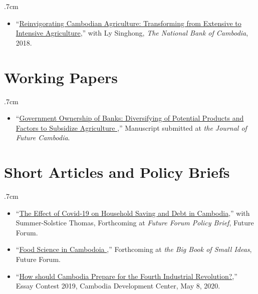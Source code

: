 \documentclass[10pt,a4paper]{article}
\begin{document}
		\begin{adjustwidth}{.7cm}{}
			\begin{itemize}[label={},itemindent=-2em,leftmargin=2em]
					
				\item “\href{https://ideas.repec.org/p/pra/mprapa/93086.html}{Reinvigorating Cambodian Agriculture: Transforming from Extensive to Intensive Agriculture},” with Ly Singhong, \textit{The National Bank of Cambodia}, 2018.	
			\end{itemize}
		\end{adjustwidth}
		\vspace{-1.5em}
\section*{Working Papers}
		\vspace{-0.5em}
		
	\begin{adjustwidth}{.7cm}{}
		\begin{itemize}[label={},itemindent=-2em,leftmargin=2em]
			\item “\href{https://nithkosal.github.io/research/papers/WP0002.pdf}{Government Ownership of Banks: Diversifying of Potential Products and Factors to Subsidize Agriculture
			},” Manuscript submitted at \textit{the Journal of Future Cambodia}.
			\end{itemize}
		\end{adjustwidth}
		\vspace{-1.5em}
\section*{Short Articles and Policy Briefs}	
\vspace{-0.5em}

\begin{adjustwidth}{.7cm}{}
	\begin{itemize}[label={},itemindent=-2em,leftmargin=2em]
		\item “\href{https://nithkosal.github.io/research/policies/COVID-19-HHSavingsDebt.pdf}{The Effect of Covid-19 on Household Saving and Debt in Cambodia},” with Summer-Solstice Thomas, Forthcoming at \textit{Future Forum Policy Brief}, Future Forum. 
		
		\item “\href{https://nithkosal.github.io/research/policies/PolicyBrief-FST.pdf}{Food Science in Cambodoia
		},” Forthcoming at \textit{the Big Book of Small Ideas}, Future Forum. 
	
		\item ``\href{https://cd-center.org/en/essay-contest-2019-first-place-winner/}{How should Cambodia Prepare for the Fourth Industrial Revolution?},” Essay Contest 2019, Cambodia Development Center, May 8, 2020.
			
		\end{itemize}
	\end{adjustwidth}
	\vspace{-1.5em}
	
\end{document}
